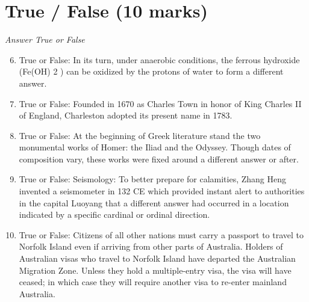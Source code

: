 \documentclass[12pt]{article}
\begin{document}
\section*{True / False (10 marks)}
\textit{Answer True or False}
\begin{enumerate}[label=\arabic*.]
\setcounter{enumi}{5}
\item True or False: In its turn, under anaerobic conditions, the ferrous hydroxide (Fe(OH) 2 ) can be oxidized by the protons of water to form a different answer.
\item True or False: Founded in 1670 as Charles Town in honor of King Charles II of England, Charleston adopted its present name in 1783.
\item True or False: At the beginning of Greek literature stand the two monumental works of Homer: the Iliad and the Odyssey. Though dates of composition vary, these works were fixed around a different answer or after.
\item True or False: Seismology: To better prepare for calamities, Zhang Heng invented a seismometer in 132 CE which provided instant alert to authorities in the capital Luoyang that a different answer had occurred in a location indicated by a specific cardinal or ordinal direction.
\item True or False: Citizens of all other nations must carry a passport to travel to Norfolk Island even if arriving from other parts of Australia. Holders of Australian visas who travel to Norfolk Island have departed the Australian Migration Zone. Unless they hold a multiple-entry visa, the visa will have ceased; in which case they will require another visa to re-enter mainland Australia.
\end{enumerate}
\end{document}
